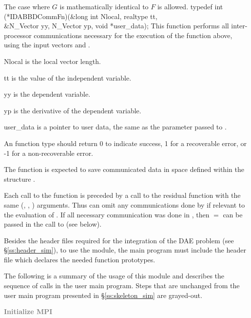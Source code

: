 {{  The case where $G$ is mathematically identical to $F$ is allowed.
}
{
  typedef int (*IDABBDCommFn)(&long int Nlocal, realtype tt,  \\
                               &N\_Vector yy, N\_Vector yp, void *user\_data);
}
{
  This  function performs all inter-processor communications necessary 
  for the execution of the  function above, using the input 
  vectors  and .
}
{
  \begin{args}
  \item[Nlocal] 
    is the local vector length.
  \item[tt]
    is the value of the independent variable.
  \item[yy]
    is the dependent variable. 
  \item[yp]
    is the derivative of the dependent variable. 
  \item[user\_data]
    is a pointer to user data, the same as the       
    parameter passed to .  
  \end{args}
}
{
  An  function type should return 0 to indicate success,
  1 for a recoverable error, or -1 for a non-recoverable error.
}
{
  The  function is expected to save communicated data in space defined
  within the structure . 

  Each call to the  function is preceded by a call to the residual
  function  with the same (, , ) arguments.  
  Thus  can omit any communications done by  if relevant to the 
  evaluation of .  
  If all necessary communication was done in , then  $=$ 
  can be passed in the call to  (see below).

}


Besides the header files required for the integration of the DAE problem
(see \S\ref{ss:header_sim}),  to use the {\idabbdpre} module, the main program 
must include the header file  which declares the needed
function prototypes.

The following is a summary of the usage of this module and describes the sequence 
of calls in the user main program. Steps that are unchanged from the user main
program presented in \S\ref{ss:skeleton_sim} are grayed-out.
\begin{Steps}
\item 
  \textcolor{gray}{\bf Initialize MPI}


\end{Steps}}
